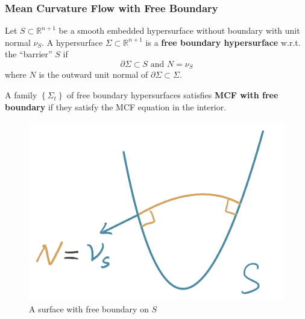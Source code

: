 \documentclass[pdf]{beamer}
\newcommand{\R}{\mathbb{R}}
\begin{document}
    \begin{frame}
        \frametitle{Mean Curvature Flow with Free Boundary}
        \begin{definition}
            \justifying
            Let $S \subset \R^{n+1}$  be a smooth embedded hypersurface without boundary with unit normal $\nu_S$. A hypersurface $\Sigma \subset \R^{n+1}$ is a \textbf{free boundary hypersurface} w.r.t. the ``barrier'' $S$ if \[\partial \Sigma  \subset S \text{ and }N = \nu _S\] where $N$ is the outward unit normal of $\partial \Sigma \subset \Sigma $.
        \end{definition}
        A family $\left\{ \Sigma_t \right\} $ of free boundary hypersurfaces satisfies \textbf{MCF with free boundary} if they satisfy the MCF equation in the interior.
        \begin{figure}[h]
            \centering
            \includegraphics[scale=0.07]{FrBdy.png}
            \caption{A surface with free boundary on $S$}
        \end{figure}
    \end{frame}
\end{document}
